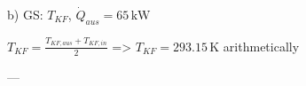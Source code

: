 b) GS: \( T_{KF} \), \( \dot{Q}_{aus} = 65 \, \text{kW} \)  

\( T_{KF} = \frac{T_{KF,aus} + T_{KF,in}}{2} \)  
=> \( T_{KF} = 293.15 \, \text{K} \)  
arithmetically  

---